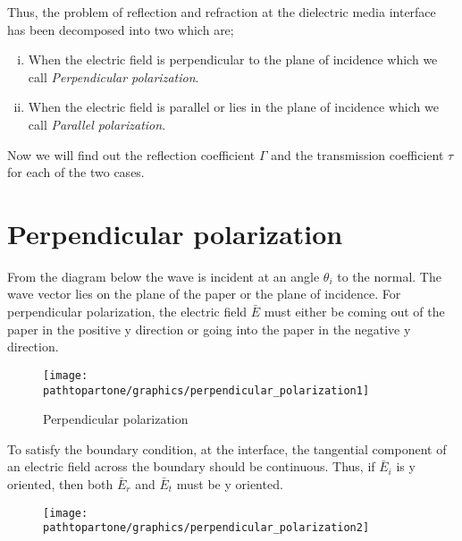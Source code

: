 Thus, the problem of reflection and refraction at the dielectric media interface has been decomposed into two which are;

\begin{enumerate}[(i)]
\item When the electric field is perpendicular to the plane of incidence which we call \emph{Perpendicular polarization}.
\item When the electric field is parallel or lies in the plane of incidence which we call \emph{Parallel polarization}.
\end{enumerate}

Now we will find out the reflection coefficient $\Gamma$ and the transmission coefficient $\tau$ for each of the two cases.

\section{Perpendicular polarization} 
From the diagram below the wave is incident at an angle $\theta_{i}$ to the normal. The wave vector lies on the plane of the paper or the plane of incidence. For perpendicular polarization, the electric field $\bar{E}$ must either be coming out of the paper in the positive y direction or going into the paper in the negative y direction.
\begin{figure}[h]
\centering
\texttt{[image: \\pathtopartone/graphics/perpendicular\_polarization1]}
\caption{Perpendicular polarization}
\label{fig:12}
\end{figure}

To satisfy the boundary condition, at the interface, the tangential component of an electric field across the boundary should be continuous. Thus, if $\bar{E}_{i}$ is y oriented, then both  $\bar{E}_{r}$ and  $\bar{E}_{t}$ must be y oriented.
\begin{figure}[h]
\centering
\texttt{[image: \\pathtopartone/graphics/perpendicular\_polarization2]}
\caption{}
\label{fig:13}
\end{figure}

